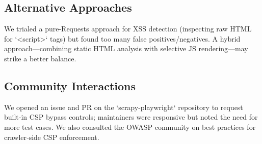 \subsection{Alternative Approaches}
We trialed a pure‐Requests approach for XSS detection (inspecting raw HTML for `<script>` tags) but found too many false positives/negatives. A hybrid approach—combining static HTML analysis with selective JS rendering—may strike a better balance.

\subsection{Community Interactions}
We opened an issue and PR on the `scrapy-playwright` repository to request built‐in CSP bypass controls; maintainers were responsive but noted the need for more test cases. We also consulted the OWASP community on best practices for crawler‐side CSP enforcement.
